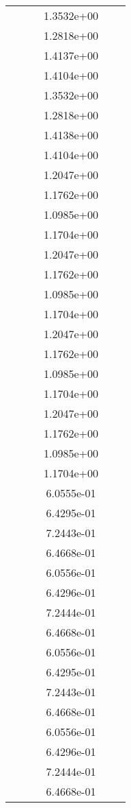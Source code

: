 \begin{xltabular}{\textwidth}{r|rS[table-format=1.3e+2]S[table-format=1.4e+2]S[table-format=1.4e+2]S[table-format=-1.5]}
&  &  & 1.3532e+00 & & \\
&  &  & 1.2818e+00 & & \\
&  &  & 1.4137e+00 & & \\
&  &  & 1.4104e+00 & & \\
&  &  & 1.3532e+00 & & \\
&  &  & 1.2818e+00 & & \\
&  &  & 1.4138e+00 & & \\
&  &  & 1.4104e+00 & & \\
&  &  & 1.2047e+00 & & \\
&  &  & 1.1762e+00 & & \\
&  &  & 1.0985e+00 & & \\
&  &  & 1.1704e+00 & & \\
&  &  & 1.2047e+00 & & \\
&  &  & 1.1762e+00 & & \\
&  &  & 1.0985e+00 & & \\
&  &  & 1.1704e+00 & & \\
&  &  & 1.2047e+00 & & \\
&  &  & 1.1762e+00 & & \\
&  &  & 1.0985e+00 & & \\
&  &  & 1.1704e+00 & & \\
&  &  & 1.2047e+00 & & \\
&  &  & 1.1762e+00 & & \\
&  &  & 1.0985e+00 & & \\
&  &  & 1.1704e+00 & & \\
&  &  & 6.0555e-01 & & \\
&  &  & 6.4295e-01 & & \\
&  &  & 7.2443e-01 & & \\
&  &  & 6.4668e-01 & & \\
&  &  & 6.0556e-01 & & \\
&  &  & 6.4296e-01 & & \\
&  &  & 7.2444e-01 & & \\
&  &  & 6.4668e-01 & & \\
&  &  & 6.0556e-01 & & \\
&  &  & 6.4295e-01 & & \\
&  &  & 7.2443e-01 & & \\
&  &  & 6.4668e-01 & & \\
&  &  & 6.0556e-01 & & \\
&  &  & 6.4296e-01 & & \\
&  &  & 7.2444e-01 & & \\
&  &  & 6.4668e-01 & & \\

\end{xltabular}
